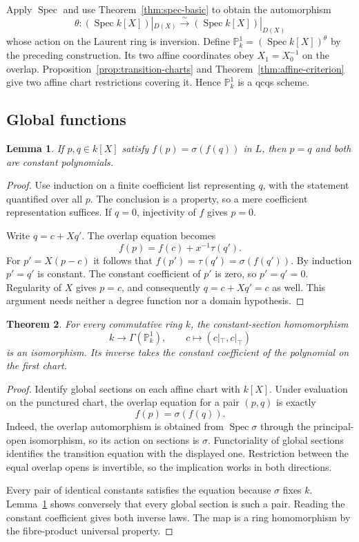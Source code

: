 \documentclass[11pt]{amsart}
\newtheorem{theorem}{Theorem}[section]
\newtheorem{lemma}[theorem]{Lemma}
\theoremstyle{definition}
\theoremstyle{remark}
\newcommand{\Spec}{\operatorname{Spec}}
\begin{document}
Apply $\Spec$ and use Theorem~\ref{thm:spec-basic} to obtain the
automorphism
\[
 \theta:(\Spec k[X])|_{D(X)}\xrightarrow{\sim}
             (\Spec k[X])|_{D(X)}
\]
whose action on the Laurent ring is inversion. Define
$\mathbb P^1_k=(\Spec k[X])^\theta$ by the preceding construction.
Its two affine coordinates obey $X_1=X_0^{-1}$ on the overlap.
Proposition~\ref{prop:transition-charts} and
Theorem~\ref{thm:affine-criterion} give two affine chart restrictions
covering it. Hence $\mathbb P^1_k$ is a qcqs scheme.

\subsection{Global functions}

\begin{lemma}\label{lem:inversion-overlap}
If $p,q\in k[X]$ satisfy $f(p)=\sigma(f(q))$ in $L$, then $p=q$ and
both are constant polynomials.
\end{lemma}
\begin{proof}
Use induction on a finite coefficient list representing $q$, with the
statement quantified over all $p$. The conclusion is a property, so a
mere coefficient representation suffices. If $q=0$, injectivity of $f$
gives $p=0$.

Write $q=c+Xq'$. The overlap equation becomes
\[
 f(p)=f(c)+x^{-1}\tau(q').
\]
For $p'=X(p-c)$ it follows that $f(p')=\tau(q')=\sigma(f(q'))$.
By induction $p'=q'$ is constant. The constant coefficient of $p'$ is
zero, so $p'=q'=0$. Regularity of $X$ gives $p=c$, and consequently
$q=c+Xq'=c$ as well. This argument needs neither a degree function nor
a domain hypothesis.
\end{proof}

\begin{theorem}\label{thm:p1-global}
For every commutative ring $k$, the constant-section homomorphism
\[
 k\longrightarrow\Gamma(\mathbb P^1_k),\qquad
 c\longmapsto(c|_\top,c|_\top)
\]
is an isomorphism. Its inverse takes the constant coefficient of the
polynomial on the first chart.
\end{theorem}
\begin{proof}
Identify global sections on each affine chart with $k[X]$. Under
evaluation on the punctured chart, the overlap equation for a pair
$(p,q)$ is exactly
\[
 f(p)=\sigma(f(q)).
\]
Indeed, the overlap automorphism is obtained from $\Spec\sigma$ through
the principal-open isomorphism, so its action on sections is $\sigma$.
Functoriality of global sections identifies the transition equation
with the displayed one. Restriction between the equal overlap opens
is invertible, so the implication works in both directions.

Every pair of identical constants satisfies the equation because
$\sigma$ fixes $k$. Lemma~\ref{lem:inversion-overlap} shows conversely
that every global section is such a pair. Reading the constant
coefficient gives both inverse laws. The map is a ring homomorphism
by the fibre-product universal property.
\end{proof}
\end{document}
